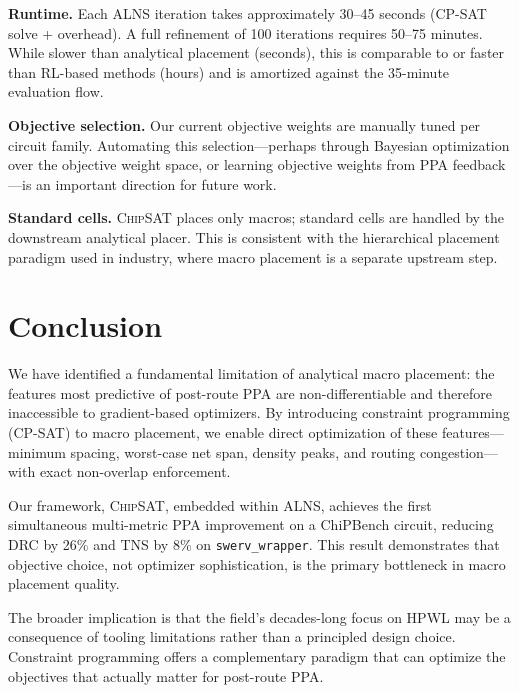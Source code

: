 \documentclass[sigconf,anonymous,review,9pt]{acmart}
\begin{document}
\textbf{Runtime.} Each ALNS iteration takes approximately 30--45 seconds (CP-SAT solve + overhead). A full refinement of 100 iterations requires 50--75 minutes. While slower than analytical placement (seconds), this is comparable to or faster than RL-based methods (hours) and is amortized against the 35-minute evaluation flow.

\textbf{Objective selection.} Our current objective weights are manually tuned per circuit family. Automating this selection---perhaps through Bayesian optimization over the objective weight space, or learning objective weights from PPA feedback---is an important direction for future work.

\textbf{Standard cells.} \textsc{ChipSAT} places only macros; standard cells are handled by the downstream analytical placer. This is consistent with the hierarchical placement paradigm used in industry, where macro placement is a separate upstream step.


\section{Conclusion}
\label{sec:conclusion}

We have identified a fundamental limitation of analytical macro placement: the features most predictive of post-route PPA are non-differentiable and therefore inaccessible to gradient-based optimizers. By introducing constraint programming (CP-SAT) to macro placement, we enable direct optimization of these features---minimum spacing, worst-case net span, density peaks, and routing congestion---with exact non-overlap enforcement.

Our framework, \textsc{ChipSAT}, embedded within ALNS, achieves the first simultaneous multi-metric PPA improvement on a ChiPBench circuit, reducing DRC by 26\% and TNS by 8\% on \texttt{swerv\_wrapper}. This result demonstrates that objective choice, not optimizer sophistication, is the primary bottleneck in macro placement quality.

The broader implication is that the field's decades-long focus on HPWL may be a consequence of tooling limitations rather than a principled design choice. Constraint programming offers a complementary paradigm that can optimize the objectives that actually matter for post-route PPA.




\end{document}
